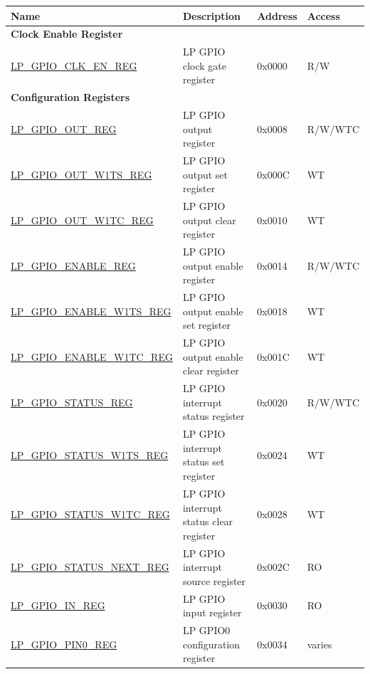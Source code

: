 \begin{longtable}{ | p{6.2cm} | p{6.9cm} | p{1.3cm} | p{1.8cm} | }
\hline\rowcolor{lightgray}
\textbf{Name} & \textbf{Description} &  \textbf{Address} & \textbf{Access} \\ \hline
\endhead
\multicolumn{4}{|l|}{\textbf{Clock Enable Register}} \\ \hline
\hyperref[regdesc:LPGPIOCLKENREG]{LP\_GPIO\_CLK\_EN\_REG} & LP GPIO clock gate register & 0x0000 & R/W \\ \hline

\multicolumn{4}{|l|}{\textbf{Configuration Registers}} \\ \hline
\hyperref[regdesc:LPGPIOOUTREG]{LP\_GPIO\_OUT\_REG} & LP GPIO output register & 0x0008 & R/W/WTC \\ \hline
\hyperref[regdesc:LPGPIOOUTW1TSREG]{LP\_GPIO\_OUT\_W1TS\_REG} & LP GPIO output set register & 0x000C & WT \\ \hline
\hyperref[regdesc:LPGPIOOUTW1TCREG]{LP\_GPIO\_OUT\_W1TC\_REG} & LP GPIO output clear register & 0x0010 & WT \\ \hline
\hyperref[regdesc:LPGPIOENABLEREG]{LP\_GPIO\_ENABLE\_REG} & LP GPIO output enable register & 0x0014 & R/W/WTC \\ \hline
\hyperref[regdesc:LPGPIOENABLEW1TSREG]{LP\_GPIO\_ENABLE\_W1TS\_REG} & LP GPIO output enable set register& 0x0018 & WT \\ \hline
\hyperref[regdesc:LPGPIOENABLEW1TCREG]{LP\_GPIO\_ENABLE\_W1TC\_REG} & LP GPIO output enable clear register & 0x001C & WT \\ \hline
\hyperref[regdesc:LPGPIOSTATUSREG]{LP\_GPIO\_STATUS\_REG} & LP GPIO interrupt status register & 0x0020 & R/W/WTC \\ \hline
\hyperref[regdesc:LPGPIOSTATUSW1TSREG]{LP\_GPIO\_STATUS\_W1TS\_REG} & LP GPIO interrupt status set register & 0x0024 & WT \\ \hline
\hyperref[regdesc:LPGPIOSTATUSW1TCREG]{LP\_GPIO\_STATUS\_W1TC\_REG} & LP GPIO interrupt status clear register & 0x0028 & WT \\ \hline
\hyperref[regdesc:LPGPIOSTATUSNEXTREG]{LP\_GPIO\_STATUS\_NEXT\_REG} & LP GPIO interrupt source register & 0x002C & RO \\ \hline
\hyperref[regdesc:LPGPIOINREG]{LP\_GPIO\_IN\_REG} & LP GPIO input register & 0x0030 & RO \\ \hline
\hyperref[regdesc:LPGPIOPINNREG]{LP\_GPIO\_PIN0\_REG} & LP GPIO0 configuration register & 0x0034 & varies \\ \hline

\end{longtable}
